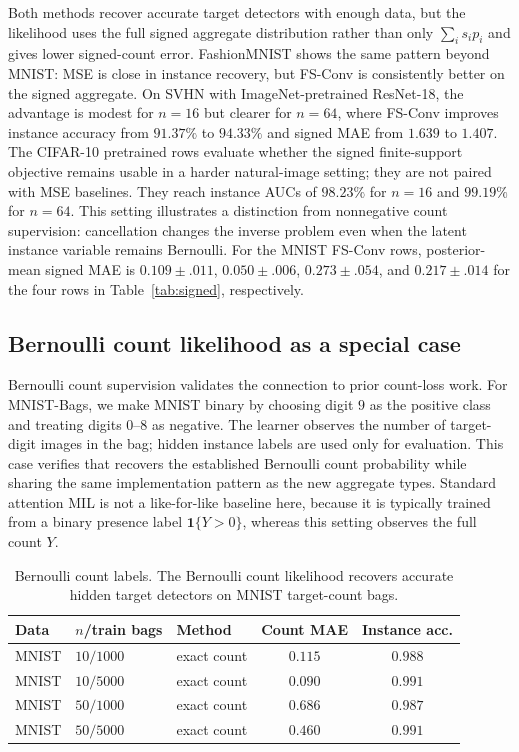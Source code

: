 Both methods recover accurate target detectors with enough data, but the likelihood uses the full signed aggregate distribution rather than only $\sum_i s_i p_i$ and gives lower signed-count error.
FashionMNIST shows the same pattern beyond MNIST: MSE is close in instance recovery, but FS-Conv is consistently better on the signed aggregate.
On SVHN with ImageNet-pretrained ResNet-18, the advantage is modest for $n=16$ but clearer for $n=64$, where FS-Conv improves instance accuracy from $91.37\%$ to $94.33\%$ and signed MAE from $1.639$ to $1.407$.
The CIFAR-10 pretrained rows evaluate whether the signed finite-support objective remains usable in a harder natural-image setting; they are not paired with MSE baselines.
They reach instance AUCs of $98.23\%$ for $n=16$ and $99.19\%$ for $n=64$.
This setting illustrates a distinction from nonnegative count supervision: cancellation changes the inverse problem even when the latent instance variable remains Bernoulli.
For the MNIST FS-Conv rows, posterior-mean signed MAE is $0.109{\pm}.011$, $0.050{\pm}.006$, $0.273{\pm}.054$, and $0.217{\pm}.014$ for the four rows in Table~\ref{tab:signed}, respectively.

\subsection{Bernoulli count likelihood as a special case}

Bernoulli count supervision validates the connection to prior count-loss work.
For MNIST-Bags, we make MNIST binary by choosing digit $9$ as the positive class and treating digits $0$--$8$ as negative.
The learner observes the number of target-digit images in the bag; hidden instance labels are used only for evaluation.
This case verifies that \method{} recovers the established Bernoulli count probability while sharing the same implementation pattern as the new aggregate types.
Standard attention MIL is not a like-for-like baseline here, because it is typically trained from a binary presence label $\mathbf{1}\{Y>0\}$, whereas this setting observes the full count $Y$.

\begin{table}[t]
\centering
\caption{Bernoulli count labels.  The Bernoulli count likelihood recovers accurate hidden target detectors on MNIST target-count bags.}
\label{tab:binary-countmil}
\begin{tabular}{lllcc}
\toprule
Data & $n$/train bags & Method & Count MAE & Instance acc. \\
\midrule
MNIST & $10/1000$ & exact count & $0.115$ & $0.988$ \\
MNIST & $10/5000$ & exact count & $0.090$ & $0.991$ \\
MNIST & $50/1000$ & exact count & $0.686$ & $0.987$ \\
MNIST & $50/5000$ & exact count & $0.460$ & $0.991$ \\
\bottomrule
\end{tabular}
\end{table}


